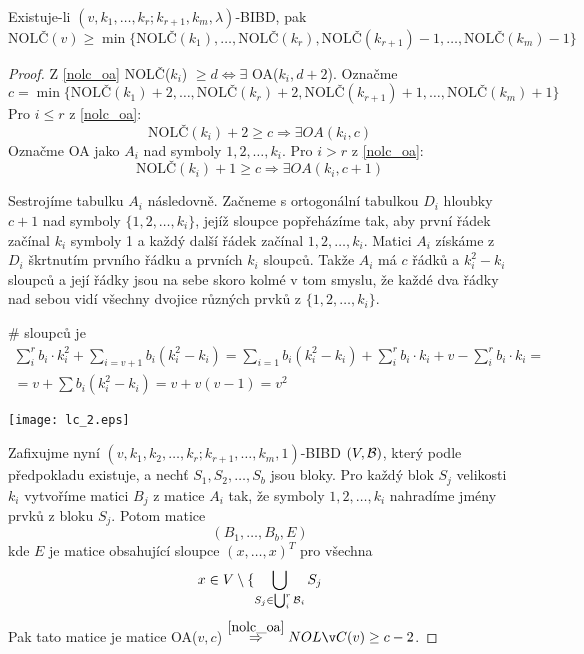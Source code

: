 \begin{theorem}\label{nolc_lower_2}~\\
    Existuje-li $(v,k_1,\ldots,k_r;k_{r+1},k_m,\lambda)$-BIBD, pak
    \[ \text{NOLČ}(v) \geq \min\{\text{NOLČ}(k_1), \ldots, \text{NOLČ}(k_r), \text{NOLČ}(k_{r+1}) - 1, \ldots, \text{NOLČ}(k_m) - 1\} \]
\end{theorem}
\begin{proof}
	Z \cref{nolc_oa} NOLČ($k_i$) $\geq d \iff \exists$ OA($k_i, d + 2$).
	Označme
	\[ c = \min\{\text{NOLČ}(k_1) + 2, \ldots, \text{NOLČ}(k_r) + 2, \text{NOLČ}(k_{r+1}) + 1, \ldots, \text{NOLČ}(k_m) + 1\} \]
	Pro $i \leq r$ z \cref{nolc_oa}:
	\[ \text{NOLČ}(k_i) + 2 \geq c \Rightarrow \exists OA(k_i, c) \]
	Označme OA jako $A_i$ nad symboly $1, 2, \ldots, k_i$.
	Pro $i > r$ z \cref{nolc_oa}:
	\[ \text{NOLČ}(k_i) + 1 \geq c \Rightarrow \exists OA(k_i, c + 1) \]

	Sestrojíme tabulku $A_i$ následovně.
	Začneme s ortogonální tabulkou $D_i$ hloubky $c + 1$ nad symboly $\{ 1, 2, \ldots, k_i \}$, jejíž sloupce popřeházíme tak, aby první řádek začínal $k_i$ symboly 1 a každý další řádek začínal $1, 2, \ldots, k_i$.
	Matici $A_i$ získáme z $D_i$ škrtnutím prvního řádku a prvních $k_i$ sloupců.
	Takže $A_i$ má $c$ řádků a $k_i^2 - k_i$ sloupců a její řádky jsou na sebe skoro kolmé v tom smyslu, že každé dva řádky nad sebou vidí všechny dvojice různých prvků z $\{1, 2, \ldots, k_i \}$.

	\# sloupců je
	\begin{gather*}
		\sum_i^r b_i \cdot k_i^2 + \sum_{i = v + 1} b_i (k_i^2 - k_i) =  \sum_{i = 1} b_i (k_i^2 - k_i) + \sum_i^r b_i \cdot k_i + v - \sum_i^r b_i \cdot k_i =\\
		= v + \sum b_i (k_i^2 - k_i) = v + v(v - 1) = v^2
	\end{gather*}

	\texttt{[image: lc\_2.eps]}

	Zafixujme nyní $(v, k_1, k_2, \ldots, k_r; k_{r + 1}, \ldots, k_m, 1)$-BIBD $(V, \operatorname{\mathcal{B}})$, který podle předpokladu existuje, a nechť $S_1, S_2, \ldots, S_b$ jsou bloky.
	Pro každý blok $S_j$ velikosti $k_i$ vytvoříme matici $B_j$ z matice $A_i$ tak, že symboly $1, 2, \ldots, k_i$ nahradíme jmény prvků z bloku $S_j$.
	Potom matice
	\[ (B_1, \ldots, B_b, E) \]
	kde $E$ je matice obsahující sloupce $(x, \ldots, x)^T$ pro všechna
	\[ x \in V \setminus \{ \bigcup_{S_j \in \bigcup_i^r \operatorname{\mathcal{B}}_i} S_j \]
	Pak tato matice je matice OA($v, c$) $\stackrel{\cref{nolc_oa}}{\Rightarrow} NOLČ(v) \geq c - 2$.
\end{proof}

